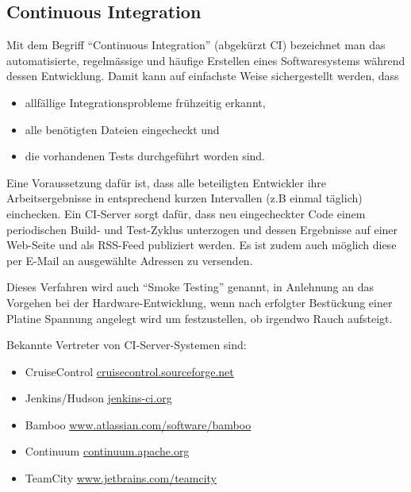 \subsection{Continuous Integration}
Mit dem Begriff ``Continuous Integration'' (abgekürzt CI) bezeichnet man das
automatisierte, regelmässige und häufige Erstellen eines Softwaresystems während
dessen Entwicklung. Damit kann auf einfachste Weise sichergestellt
werden, dass
\begin{itemize}
\item allfällige Integrationsprobleme frühzeitig erkannt,
\item alle benötigten Dateien eingecheckt und
\item die vorhandenen Tests durchgeführt worden sind.
\end{itemize}
Eine Voraussetzung dafür ist, dass alle beteiligten
Entwickler ihre Arbeitsergebnisse in entsprechend kurzen Intervallen (z.B
einmal täglich) einchecken.
\newslide
Ein CI-Server sorgt dafür, dass neu eingecheckter Code einem
periodischen Build- und
Test-Zyklus unterzogen und dessen Ergebnisse auf einer Web-Seite und
als RSS-Feed publiziert werden.
Es ist zudem auch möglich diese per E-Mail an ausgewählte
Adressen zu versenden.

Dieses Verfahren wird auch ``Smoke Testing'' genannt, in
Anlehnung an das Vorgehen bei der Hardware-Entwicklung, wenn nach
erfolgter Bestückung einer Platine Spannung angelegt wird um
festzustellen, ob irgendwo Rauch aufsteigt.

\newslide
Bekannte Vertreter von CI-Server-Systemen sind:
\begin{itemize}
\item CruiseControl \href{http://cruisecontrol.sourceforge.net}
                        {cruisecontrol.sourceforge.net}
\item Jenkins/Hudson \href{http://jenkins-ci.org}{jenkins-ci.org}
\item Bamboo  \href{http://www.atlassian.com/software/bamboo}
     {www.atlassian.com/software/bamboo}
\item Continuum \href{http://continuum.apache.org}{continuum.apache.org}
\item TeamCity  \href{http://www.jetbrains.com/teamcity}
      {www.jetbrains.com/teamcity}
\end{itemize}
%
\newslide
